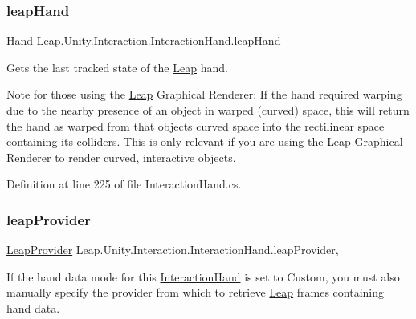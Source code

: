 \subsubsection{\texorpdfstring{leapHand}{leapHand}}
{\footnotesize\ttfamily \mbox{\hyperlink{class_leap_1_1_hand}{Hand}} Leap.\+Unity.\+Interaction.\+Interaction\+Hand.\+leap\+Hand\hspace{0.3cm}{\ttfamily [get]}}



Gets the last tracked state of the \mbox{\hyperlink{namespace_leap_1_1_unity_1_1_leap}{Leap}} hand. 

Note for those using the \mbox{\hyperlink{namespace_leap_1_1_unity_1_1_leap}{Leap}} Graphical Renderer\+: If the hand required warping due to the nearby presence of an object in warped (curved) space, this will return the hand as warped from that object\textquotesingle{}s curved space into the rectilinear space containing its colliders. This is only relevant if you are using the \mbox{\hyperlink{namespace_leap_1_1_unity_1_1_leap}{Leap}} Graphical Renderer to render curved, interactive objects. 

Definition at line 225 of file Interaction\+Hand.\+cs.

\mbox{\label{class_leap_1_1_unity_1_1_interaction_1_1_interaction_hand_af5d2087b092dc81bba8b6f4fae96999b}} 
\subsubsection{\texorpdfstring{leapProvider}{leapProvider}}
{\footnotesize\ttfamily \mbox{\hyperlink{class_leap_1_1_unity_1_1_leap_provider}{Leap\+Provider}} Leap.\+Unity.\+Interaction.\+Interaction\+Hand.\+leap\+Provider\hspace{0.3cm}{\ttfamily [get]}, {\ttfamily [set]}}



If the hand data mode for this \mbox{\hyperlink{class_leap_1_1_unity_1_1_interaction_1_1_interaction_hand}{Interaction\+Hand}} is set to Custom, you must also manually specify the provider from which to retrieve \mbox{\hyperlink{namespace_leap_1_1_unity_1_1_leap}{Leap}} frames containing hand data. 



